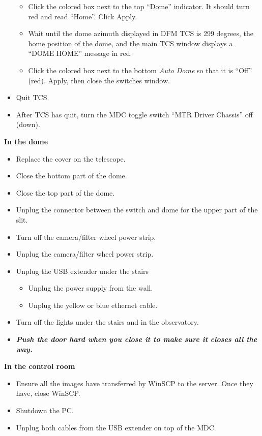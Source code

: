 \documentclass[letterpaper, 12pt]{report}
\newcommand{\location}[1]{\noindent\large{\textbf{#1}}}
\newcommand{\indome}{\location{In the dome}}
\newcommand{\incontrol}{\location{In the control room}}
\begin{document}
\begin{itemize}
\begin{itemize}
			\item Click the colored box next to the top ``Dome'' indicator. It should turn red and read ``Home''. Click Apply.
			\item Wait until the dome azimuth displayed in DFM TCS is 299 degrees, the home position of the dome, and the main TCS window displays a ``DOME HOME'' message in red.
			\item Click the colored box next to the bottom \emph{Auto Dome} so that it is ``Off'' (red). Apply, then close the switches window.
		\end{itemize}
		\item Quit TCS.
		\item After TCS has quit, turn the MDC toggle switch ``MTR Driver Chassis'' off (down).
	\end{itemize}

\indome

\begin{itemize}
	\item Replace the cover on the telescope.
	\item Close the bottom part of the dome.
	\item Close the top part of the dome.
	\item Unplug the connector between the switch and dome for the upper part of the slit.
	\item Turn off the camera/filter wheel power strip.
	\item Unplug the camera/filter wheel power strip.
	\item Unplug the USB extender under the stairs
		\begin{itemize}
			\item Unplug the power supply from the wall.
			\item Unplug the yellow or blue ethernet cable.
		\end{itemize}
	\item Turn off the lights under the stairs and in the observatory.
	\item \textbf{\emph{Push the door hard when you close it to make sure it closes all the way.}}
\end{itemize}

\incontrol

\begin{itemize}
	\item Ensure all the images have transferred by WinSCP to the server. Once they have, close WinSCP.
	\item Shutdown the PC.
	\item Unplug both cables from the USB extender on top of the MDC.
\end{itemize}
\end{document}
